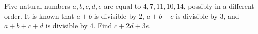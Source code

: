 Five natural numbers $a, b, c, d, e$ are equal to $4, 7, 11 , 10, 14$, possibly in a different order. It is known that $a+b$ is divisible by $2$, $a+b+c$ is divisible by $3$, and $a+b+c+d$ is divisible by $4$. Find $c+2d+3e$.
